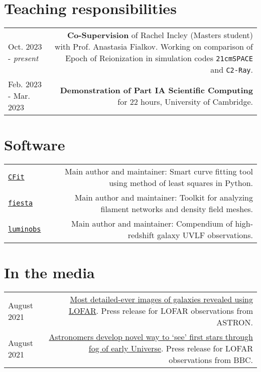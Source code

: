 \documentclass{article}
\begin{document}
\section*{Teaching responsibilities}

\begin{tabular}{L!{\vrule}R}

	Oct. 2023 - \textit{present} & \textbf{Co-Supervision} of Rachel Incley (Masters student) with Prof. Anastasia Fialkov. Working on comparison of Epoch of Reionization in simulation codes \texttt{21cmSPACE} and \texttt{C2-Ray}. \\
  Feb. 2023 - Mar. 2023 & \textbf{Demonstration of Part IA Scientific Computing} for 22 hours, University of Cambridge.\\

\end{tabular}

\section*{Software}

\begin{tabular}{L!{\vrule}R}
	\href{https://github.com/JitenDhandha/CFit}{\texttt{CFit}} & Main author and maintainer: Smart curve fitting tool using method of least squares in Python.\\
	\href{https://fiesta-astro.readthedocs.io}{\texttt{fiesta}} & Main author and maintainer: Toolkit for analyzing filament networks and density field meshes. \\
	\href{https://github.com/JitenDhandha/luminobs}{\texttt{luminobs}} & Main author and maintainer: Compendium of high-redshift galaxy UVLF observations.\\
\end{tabular}

\section*{In the media}

\begin{tabular}{L!{\vrule}R}
	August 2021 & \href{https://www.astron.nl/most-detailed-ever-images-of-galaxies-revealed-using-lofar }{Most detailed-ever images of galaxies revealed using LOFAR}. Press release for LOFAR observations from ASTRON. \\
	August 2021 & \href{https://www.bbc.co.uk/news/science-environment-57998940}{Astronomers develop novel way to `see' first stars through fog of early Universe}. Press release for LOFAR observations from BBC. \\
\end{tabular}
\end{document}
